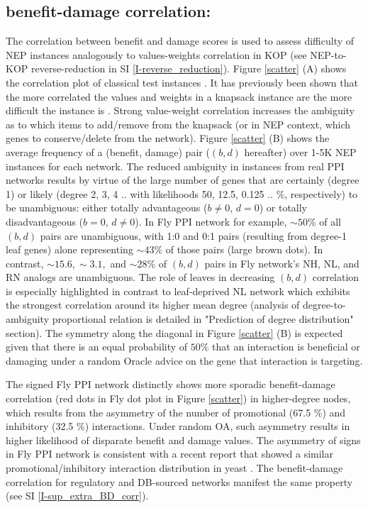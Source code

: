 	\subsection{benefit-damage correlation:}
		The correlation between benefit and damage scores is used to assess difficulty of NEP instances analogously to values-weights correlation in KOP (see NEP-to-KOP reverse-reduction in SI \ref{I-reverse_reduction}). Figure \ref{scatter} (A) shows the correlation plot of classical test instances \cite{pisinger_core_1999-1}. It has previously been shown that the more correlated the values and weights in a knapsack instance are the more difficult the instance is \cite{pisinger_where_2005}. Strong value-weight correlation increases the ambiguity as to which items to add/remove from the knapsack (or in NEP context, which genes to conserve/delete from the network). Figure \ref{scatter} (B) shows the average frequency of a (benefit, damage) pair ($(b,d)$ hereafter) over 1-5K NEP instances for each network. The reduced ambiguity in instances from real PPI networks results by virtue of the large number of genes that are certainly (degree 1) or likely (degree 2, 3, 4 .. with likelihoods 50, 12.5, 0.125 .. \%, respectively) to be unambiguous: either totally advantageous ($b\neq 0$, $d=0$) or totally disadvantageous ($b=0$, $d\neq 0$). In Fly PPI network for example, ${\sim}50\%$ of all $(b,d)$ pairs are unambiguous,  with 1:0 and 0:1 pairs (resulting from degree-1 leaf genes) alone representing  ${\sim}43\%$  of those pairs (large brown dots). In contrast, ${\sim}15.6, {\sim}3.1,$ and ${\sim}28 \%$ of $(b,d)$ pairs in Fly network's  NH, NL, and RN analogs are unambiguous. The role of leaves in decreasing $(b,d)$ correlation is especially highlighted in contrast to leaf-deprived NL network which exhibits the strongest correlation around its higher mean degree (analysis of degree-to-ambiguity proportional relation is detailed in "Prediction of degree distribution" section). The symmetry along the diagonal in Figure \ref{scatter} (B) is expected given that there is an equal probability of $50\%$ that an interaction is beneficial or damaging under a random Oracle advice on the gene that interaction is targeting.

		The signed Fly PPI network distinctly shows more sporadic benefit-damage correlation (red dots in Fly dot plot in Figure \ref{scatter}) in higher-degree nodes, which results from the asymmetry of the number of promotional (67.5 \%) and inhibitory (32.5 \%) interactions. Under random OA, such asymmetry results in higher likelihood of disparate benefit and damage values. The asymmetry of signs in Fly PPI network is consistent with a recent report that showed a similar promotional/inhibitory interaction distribution in yeast \cite{costanzo_global_2016}. The benefit-damage correlation for regulatory and DB-sourced networks manifest the same property (see SI \ref{I-sup_extra_BD_corr}).
